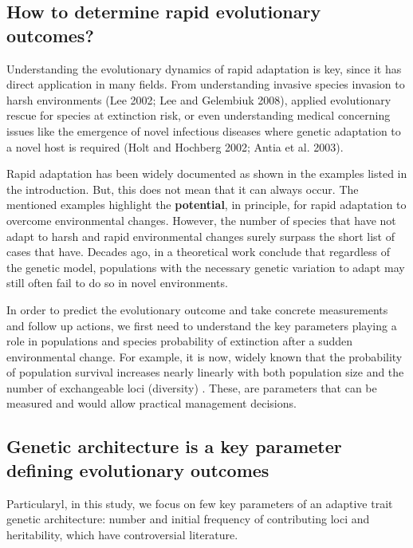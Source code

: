 \documentclass{article}
\begin{document}
\subsection{How to determine rapid evolutionary outcomes?}

Understanding the evolutionary dynamics of rapid adaptation is key, since it has direct application in many fields. From understanding invasive species invasion to harsh environments (Lee 2002; Lee and Gelembiuk 2008), applied evolutionary rescue for species at extinction risk, or even understanding medical concerning issues like the emergence of novel infectious diseases where genetic adaptation to a novel host is required (Holt and Hochberg 2002; Antia et al. 2003).

Rapid adaptation has been widely documented as shown in the examples listed in the introduction. But, this does not mean that it can always occur. The mentioned examples highlight the \textbf{potential}, in principle, for rapid adaptation to overcome environmental changes. However, the number of species that have not adapt to harsh and rapid environmental changes surely surpass  the short list of cases that have. Decades ago, in a theoretical work \citep{Gomulkiewicz1995-sj} conclude that regardless of the genetic model, populations with the necessary genetic variation to adapt may still often fail to do so in novel environments. 

In order to predict the evolutionary outcome and take concrete measurements and follow up actions, we first need to understand the key parameters playing a role in populations and species probability of extinction after a sudden environmental change. For example, it is now, widely known that the  probability  of  population  survival  increases  nearly  linearly  with  both  population  size  and  the number of exchangeable loci (diversity) . These, are  parameters that can be measured and would allow practical management decisions. 

\subsection{Genetic architecture is a key parameter defining evolutionary outcomes}

Particularyl, in this study, we focus on few key parameters of an adaptive trait genetic architecture: number  and initial frequency of contributing loci and heritability, which have controversial literature. 
\end{document}
